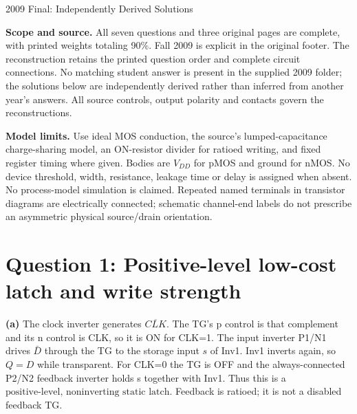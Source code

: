 \documentclass[10pt]{article}
\begin{document}
\begin{center}{\Large 2009 Final: Independently Derived Solutions}\end{center}
\textbf{Scope and source.} All seven questions and three original pages are complete, with printed weights totaling 90\%. Fall 2009 is explicit in the original footer. The reconstruction retains the printed question order and complete circuit connections. No matching student answer is present in the supplied 2009 folder; the solutions below are independently derived rather than inferred from another year's answers. All source controls, output polarity and contacts govern the reconstructions.

\textbf{Model limits.} Use ideal MOS conduction, the source's lumped-capacitance charge-sharing model, an ON-resistor divider for ratioed writing, and fixed register timing where given. Bodies are $V_{DD}$ for pMOS and ground for nMOS. No device threshold, width, resistance, leakage time or delay is assigned when absent. No process-model simulation is claimed. Repeated named terminals in transistor diagrams are electrically connected; schematic channel-end labels do not prescribe an asymmetric physical source/drain orientation.

\section*{Question 1: Positive-level low-cost latch and write strength}
\textbf{(a)} The clock inverter generates $\overline{CLK}$. The TG's p control is that complement and its n control is CLK, so it is ON for CLK=1. The input inverter P1/N1 drives $\bar D$ through the TG to the storage input $s$ of Inv1. Inv1 inverts again, so $Q=D$ while transparent. For CLK=0 the TG is OFF and the always-connected P2/N2 feedback inverter holds s together with Inv1. Thus this is a $\boxed{\text{positive-level, noninverting static latch}}$. Feedback is ratioed; it is not a disabled feedback TG.
\end{document}
